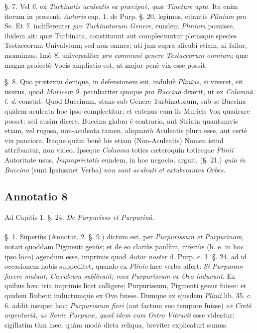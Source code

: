 \documentclass[a4paper, 11pt, oneside, polutonikogreek, german]{article}
\begin{document}
§. 7. Vel \emph{6.} ex \emph{Turbinatis aculeatis ea præcipuè, quæ Tincture apta}. Ita enim iterum in præsenti \emph{Autoris} cap. 1. de Purp. §. 20. legimus, citantis \emph{Plinium} pro Se. Et \emph{7.} indifferenter \emph{pro Turbinatorum Genere}, eundem \emph{Plinium} posuisse, ibidem ait: quæ Turbinata, constituunt aut complectuntur plerasque species Testaceorum Univalvium; sed non omnes; uti jam supra alicubi etiam, ni fallor, monuimus. Imò \emph{8.} universaliter \emph{pro communi genere Testaceorum omnium}; quæ magna profectò Vocis ampliatio est, ut major penè vix esse possit.

§. 8. Quo prætextu denique, in defensionem sui, indubiè \emph{Plinius}, si viveret, sit usurus, quod \emph{Muricem} \emph{9.} peculiariter quoque \emph{pro Buccino} dixerit, ut ex \emph{Columnâ l. d.} constat. Quod Buccinum, stans sub Genere Turbinatorum, sub se Buccina quidem aculeata hoc ipso complectitur; et eatenus cum iis Muricis Vox quadrare posset: sed ausim dicere, Buccina glabra é contrario, aut Striata quantumvis etiam, vel rugosa, non-aculeata tamen, aliquantò Aculeatis plura esse, aut certè vix pauciora. Itaque quàm benè his etiam (Non-Aculeatis) Nomen istud attribuatur, non video. Ipseque \emph{Columna} toties cæteroquin totiesque \emph{Plinii} Autoritate usus, \emph{Improprietatis} eundem, in hoc negocio, arguit, (§. 21.) \emph{quia in Buccino} (sunt Ipsiusmet Verba) \emph{non sunt aculeati et extuberantes Orbes}.

\subsection{Annotatio 8}
\begin{center}
Ad Capitis 1. §. 24. \emph{De Purpurisso et Purpurinâ}.
\end{center}
\paragraph{}
§. 1. Superiùs (Annotat. 2. §. 9.) dictum est, per \emph{Purpurissum et Purpurinam}, notari quoddam Pigmenti genùs; et de eo clariùs paulùm, inferiùs (h. e. in hoc ipso loco) agendum esse, imprimis quod \emph{Autor noster} d. Purp. c. 1. §. 24. ad id occasionem nobis suppeditet, quando ex \emph{Plinio} hæc verba affert: \emph{Si Purpuram facere malunt, Cœruleum sublinunt; mox Purpurissum ex Ovo inducunt}. Ex quibus hæc tria imprimis licet colligere; Purpurissum, Pigmenti genus fuisse: et quidem Rubeti: inductumque ex Ovo fuisse. Dumque ex ejusdem \emph{Plinii} lib. 35. c. 6. addit insuper hoc; \emph{Purpurissum fieri} (aut factum suo tempore fuisse) \emph{ex Cretâ argentariâ, ac Sanie Purpuræ, quod idem cum Ostro Vitruvii} esse videatur: sigillatim tàm hæc, quàm modò dicta reliqua, breviter explicaturi sumus.
\end{document}
